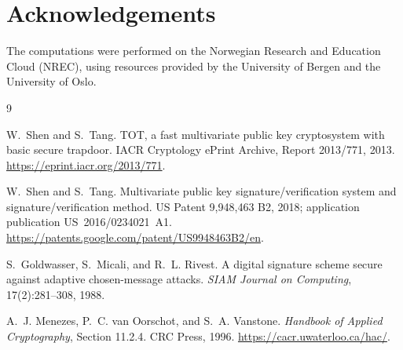 \documentclass[10pt,a4paper]{article}
\begin{document}
\section*{Acknowledgements}
The computations were performed on the Norwegian Research and Education Cloud (NREC), using resources provided by the University of Bergen and the University of Oslo.

\begin{thebibliography}{9}

W.~Shen and S.~Tang.
\newblock TOT, a fast multivariate public key cryptosystem with basic secure
trapdoor.
\newblock IACR Cryptology ePrint Archive, Report 2013/771, 2013.
\newblock \url{https://eprint.iacr.org/2013/771}.

W.~Shen and S.~Tang.
\newblock Multivariate public key signature/verification system and
signature/verification method.
\newblock US Patent 9,948,463 B2, 2018; application publication
US~2016/0234021~A1.
\newblock \url{https://patents.google.com/patent/US9948463B2/en}.

S.~Goldwasser, S.~Micali, and R.~L. Rivest.
\newblock A digital signature scheme secure against adaptive chosen-message
attacks.
\newblock \emph{SIAM Journal on Computing}, 17(2):281--308, 1988.

A.~J. Menezes, P.~C. van Oorschot, and S.~A. Vanstone.
\newblock \emph{Handbook of Applied Cryptography}, Section 11.2.4.
\newblock CRC Press, 1996.
\newblock \url{https://cacr.uwaterloo.ca/hac/}.

\end{thebibliography}
\end{document}
